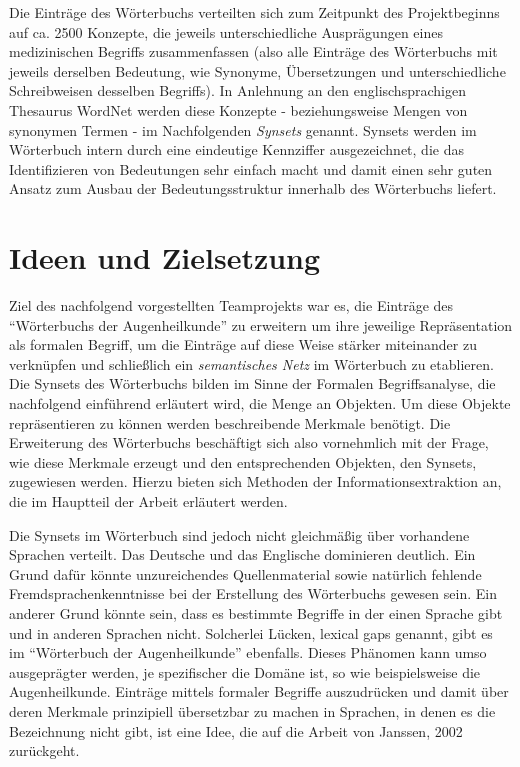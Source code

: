 \documentclass[pagesize,paper=A4,DIV=calc,fontsize=12pt,draft=false]{scrreprt}
\begin{document}
Die Einträge des Wörterbuchs verteilten sich zum Zeitpunkt des Projektbeginns auf ca. 2500 Konzepte, die jeweils unterschiedliche Ausprägungen eines medizinischen Begriffs zusammenfassen (also alle Einträge des Wörterbuchs mit jeweils derselben Bedeutung, wie Synonyme, Übersetzungen und unterschiedliche Schreibweisen desselben Begriffs). 
In Anlehnung an den englischsprachigen Thesaurus WordNet werden diese Konzepte - beziehungsweise Mengen von synonymen Termen - im Nachfolgenden \emph{Synsets} genannt. 
Synsets werden im Wörterbuch intern durch eine eindeutige Kennziffer ausgezeichnet, die das Identifizieren von Bedeutungen sehr einfach macht und damit einen sehr guten Ansatz zum Ausbau der Bedeutungsstruktur innerhalb des Wörterbuchs liefert.

\section{Ideen und Zielsetzung}

Ziel des nachfolgend vorgestellten Teamprojekts war es, die Einträge des \enquote{Wörterbuchs der Augenheilkunde} zu erweitern um ihre jeweilige Repräsentation als formalen Begriff, um die Einträge auf diese Weise stärker miteinander zu verknüpfen und schließlich ein \emph{semantisches Netz} im Wörterbuch zu etablieren. 
Die Synsets des Wörterbuchs bilden im Sinne der Formalen Begriffsanalyse, die nachfolgend einführend erläutert wird, die Menge an Objekten. 
Um diese Objekte repräsentieren zu können werden beschreibende Merkmale benötigt. 
Die Erweiterung des Wörterbuchs beschäftigt sich also vornehmlich mit der Frage, wie diese Merkmale erzeugt und den entsprechenden Objekten, den Synsets, zugewiesen werden. 
Hierzu bieten sich Methoden der Informationsextraktion an, die im Hauptteil der Arbeit erläutert werden. 

Die Synsets im Wörterbuch sind jedoch nicht gleichmäßig über vorhandene Sprachen verteilt. 
Das Deutsche und das Englische dominieren deutlich. 
Ein Grund dafür könnte unzureichendes Quellenmaterial sowie natürlich fehlende Fremdsprachenkenntnisse bei der Erstellung des Wörterbuchs gewesen sein. 
Ein anderer Grund könnte sein, dass es bestimmte Begriffe in der einen Sprache gibt und in anderen Sprachen nicht. 
Solcherlei Lücken, lexical gaps genannt, gibt es im \enquote{Wörterbuch der Augenheilkunde} ebenfalls. 
Dieses Phänomen kann umso ausgeprägter werden, je spezifischer die Domäne ist, so wie beispielsweise die Augenheilkunde. 
Einträge mittels formaler Begriffe auszudrücken und damit über deren Merkmale prinzipiell übersetzbar zu machen in Sprachen, in denen es die Bezeichnung nicht gibt, ist eine Idee, die auf die Arbeit von Janssen, 2002 zurückgeht. 
\end{document}
